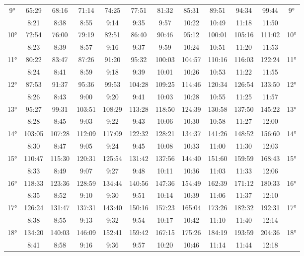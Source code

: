 \begin{scriptsize}
\begin{tabular}{c || c | c | c | c | c | c | c | c | c | c || c}
		\multirow{2}{*}{9°}&65:29&68:16&71:14&74:25&77:51&81:32&85:31&89:51&94:34&99:44&\multirow{2}{*}{9°}\\ \space&8:21&8:38&8:55&9:14&9:35&9:57&10:22&10:49&11:18&11:50&\space\\\hline
		\multirow{2}{*}{10°}&72:54&76:00&79:19&82:51&86:40&90:46&95:12&100:01&105:16&111:02&\multirow{2}{*}{10°}\\ \space&8:23&8:39&8:57&9:16&9:37&9:59&10:24&10:51&11:20&11:53&\space\\\hline
		\multirow{2}{*}{11°}&80:22&83:47&87:26&91:20&95:32&100:03&104:57&110:16&116:03&122:24&\multirow{2}{*}{11°}\\ \space&8:24&8:41&8:59&9:18&9:39&10:01&10:26&10:53&11:22&11:55&\space\\\hline
		\multirow{2}{*}{12°}&87:53&91:37&95:36&99:53&104:28&109:25&114:46&120:34&126:54&133:50&\multirow{2}{*}{12°}\\ \space&8:26&8:43&9:00&9:20&9:41&10:03&10:28&10:55&11:25&11:57&\space\\\hline
		\multirow{2}{*}{13°}&95:27&99:31&103:51&108:29&113:28&118:50&124:39&130:58&137:50&145:22&\multirow{2}{*}{13°}\\ \space&8:28&8:45&9:03&9:22&9:43&10:06&10:30&10:58&11:27&12:00&\space\\\hline
		\multirow{2}{*}{14°}&103:05&107:28&112:09&117:09&122:32&128:21&134:37&141:26&148:52&156:60&\multirow{2}{*}{14°}\\ \space&8:30&8:47&9:05&9:24&9:45&10:08&10:33&11:00&11:30&12:03&\space\\\hline
		\multirow{2}{*}{15°}&110:47&115:30&120:31&125:54&131:42&137:56&144:40&151:60&159:59&168:43&\multirow{2}{*}{15°}\\ \space&8:33&8:49&9:07&9:27&9:48&10:11&10:36&11:03&11:33&12:06&\space\\\hline
		\multirow{2}{*}{16°}&118:33&123:36&128:59&134:44&140:56&147:36&154:49&162:39&171:12&180:33&\multirow{2}{*}{16°}\\ \space&8:35&8:52&9:10&9:30&9:51&10:14&10:39&11:06&11:37&12:10&\space\\\hline
		\multirow{2}{*}{17°}&126:24&131:47&137:31&143:40&150:16&157:23&165:04&173:26&182:32&192:31&\multirow{2}{*}{17°}\\ \space&8:38&8:55&9:13&9:32&9:54&10:17&10:42&11:10&11:40&12:14&\space\\\hline
		\multirow{2}{*}{18°}&134:20&140:03&146:09&152:41&159:42&167:15&175:26&184:19&193:59&204:36&\multirow{2}{*}{18°}\\ \space&8:41&8:58&9:16&9:36&9:57&10:20&10:46&11:14&11:44&12:18&\space\\\hline

\end{tabular}
\end{scriptsize}

